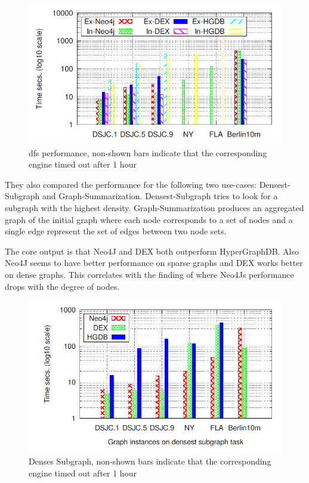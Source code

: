 \documentclass{acm_proc_article-sp}
\begin{document}
\begin{figure}[hbtp]
	\centering
	\includegraphics[scale=0.32]{dfs.png}
	\caption{dfs performance, non-shown bars indicate that
		the corresponding engine timed out after 1 hour\cite{comparision}}
\end{figure}

They also compared the performance for the following two use-cases: Densest-Subgraph and Graph-Summarization. Densest-Subgraph tries to look for a subgraph with the highest density. Graph-Summarization produces an aggregated graph of the initial graph where each node corresponds to a set of nodes and a single edge represent the set of edges between two node sets.

The core output is that Neo4J and DEX both outperform HyperGraphDB. Also Neo4J seems to have better performance on sparse graphs and DEX works better on dense graphs. This correlates with the finding of \cite{healtcare} where Neo4Js performance drops with the degree of nodes.

\begin{figure}[hbtp]
	\centering
	\includegraphics[scale=0.32]{dense.png}
	\caption{Denses Subgraph, non-shown bars indicate that
		the corresponding engine timed out after 1 hour\cite{comparision}}
\end{figure}
\end{document}

